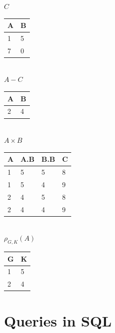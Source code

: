 \documentclass[12pt, a4paper]{article}
\begin{document}
			\begin{minipage}[t]{0.32\textwidth}
				\begin{center}
				$C$\\
				\begin{tabular}{|l|l|}
				\hline
				A & B \\ \hline
				1 & 5 \\ \hline
				7 & 0 \\ \hline
				\end{tabular}\\[4mm]
				$A- C$\\
				\begin{tabular}{|l|l|}
				\hline
				A & B \\ \hline
				2 & 4 \\ \hline
				\end{tabular}\\[4mm]
				$A\times B$\\
				\begin{tabular}{|l|l|l|l|}
				\hline
				A & A.B & B.B & C \\ \hline
				1 & 5 & 5 & 8\\ \hline
				1 & 5 & 4 & 9\\ \hline
				2 & 4 & 5 & 8\\ \hline
				2 & 4 & 4 & 9\\ \hline
				\end{tabular}\\[4mm]
				$\rho_{G,K}(A)$\\
				\begin{tabular}{|l|l|}
				\hline
				G & K \\ \hline
				1 & 5 \\ \hline
				2 & 4 \\ \hline
				\end{tabular}
				\end{center}				
			\end{minipage}
	\section{Queries in SQL}
\end{document}
